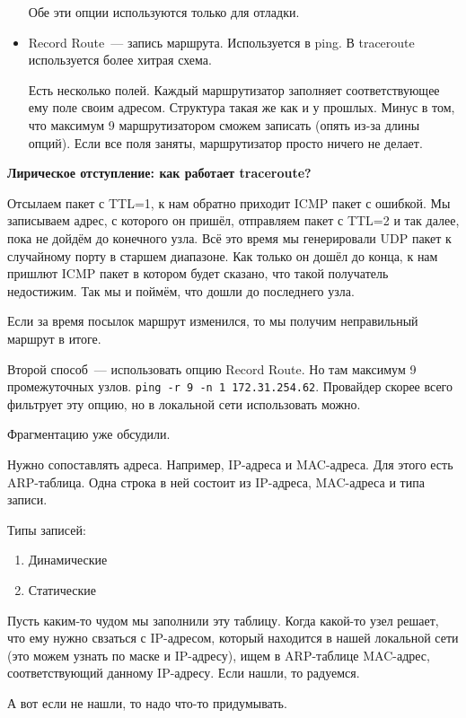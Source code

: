 \begin{itemize}
    Обе эти опции используются только для отладки.

    \item Record Route~--- запись маршрута. Используется в ping. В traceroute используется более хитрая схема.

    Есть несколько полей. Каждый маршрутизатор заполняет соответствующее ему поле своим адресом. Структура такая же как и у прошлых. Минус в том, что максимум 9 маршрутизатором сможем записать (опять из-за длины опций). Если все поля заняты, маршрутизатор просто ничего не делает.
\end{itemize}

{\bf Лирическое отступление: как работает traceroute?}

Отсылаем пакет с TTL=1, к нам обратно приходит ICMP пакет с ошибкой. Мы записываем адрес, с которого он пришёл, отправляем пакет с TTL=2 и так далее, пока не дойдём до конечного узла. Всё это время мы генерировали UDP пакет к случайному порту в старшем диапазоне. Как только он дошёл до конца, к нам пришлют ICMP пакет в котором будет сказано, что такой получатель недостижим. Так мы и поймём, что дошли до последнего узла.

Если за время посылок маршрут изменился, то мы получим неправильный маршрут в итоге.

Второй способ~--- использовать опцию Record Route. Но там максимум 9 промежуточных узлов. {\tt ping -r 9 -n 1 172.31.254.62}. Провайдер скорее всего фильтрует эту опцию, но в локальной сети использовать можно.


Фрагментацию уже обсудили.

Нужно сопоставлять адреса. Например, IP-адреса и MAC-адреса. Для этого есть ARP-таблица. Одна строка в ней состоит из IP-адреса, MAC-адреса и типа записи. 

Типы записей:
\begin{enumerate}
    \item Динамические
    \item Статические
\end{enumerate}

Пусть каким-то чудом мы заполнили эту таблицу. Когда какой-то узел решает, что ему нужно свзаться с IP-адресом, который находится в нашей локальной сети (это можем узнать по маске и IP-адресу), ищем в ARP-таблице MAC-адрес, соответствующий данному IP-адресу. Если нашли, то радуемся. 

А вот если не нашли, то надо что-то придумывать.

